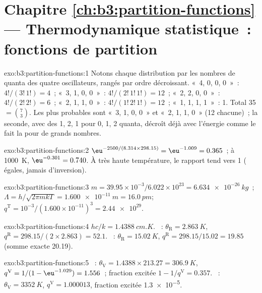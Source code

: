 \section*{Chapitre \ref{ch:b3:partition-functions} --- Thermodynamique statistique~: fonctions de partition}

\begin{solution}{exo:b3:partition-functions:1}
Notons chaque distribution par les nombres de quanta des quatre
oscillateurs, rangés par ordre décroissant. «~4, 0, 0, 0~»~: $4!/(3!\,1!) = 4$~; «~3, 1, 0, 0~»~: $4!/(2!\,1!\,1!) = 12$~; «~2, 2, 0, 0~»~:
$4!/(2!\,2!) = 6$~; «~2, 1, 1, 0~»~: $4!/(1!\,2!\,1!) = 12$~; «~1, 1, 1, 1~»~: 1. Total 35 $= \binom73$.
Les plus probables sont «~3, 1, 0, 0~» et «~2, 1, 1, 0~» (12 chacune)~;
la seconde, avec des  1, 2, 1 pour 0, 1, 2 quanta, décroît
déjà avec l'énergie comme le fait la  pour de
grands nombres.
\end{solution}

\begin{solution}{exo:b3:partition-functions:2}
$\eu^{-2500/(8.314 \times 298.15)} = \eu^{-1.009} = 0.365$~; à \qty{1000}{K}, $\eu^{-0.301} = 0.740$.
À très haute température, le rapport tend vers 1 ( égales,
jamais d'inversion).
\end{solution}

\begin{solution}{exo:b3:partition-functions:3}
$m = 39.95\times10^{-3}/6.022\times10^{23} = \qty{6.634e-26}{kg}$~; $\Lambda = h/\sqrt{2\pi mkT} =
\qty{1.600e-11}{m} = \qty{16.0}{pm}$; $q^{\mathrm T} = 10^{-3}/(1.600\times10^{-11})^3 = \num{2.44e29}$.
\end{solution}

\begin{solution}{exo:b3:partition-functions:4}
$hc/k = \qty{1.4388}{cm.K}$. ~: $\theta_{\mathrm R} = \qty{2.863}{K}$, $q^{\mathrm R} = 298.15/(2 \times 2.863) = 52.1$.
~: $\theta_{\mathrm R} = \qty{15.02}{K}$, $q^{\mathrm R} = 298.15/15.02 = 19.85$
(somme exacte 20.19).
\end{solution}

\begin{solution}{exo:b3:partition-functions:5}
~: $\theta_{\mathrm V} = 1.4388 \times 213.27 = \qty{306.9}{K}$, $q^{\mathrm V} = 1/(1 - \eu^{-1.029}) = 1.556$~;
fraction excitée $1 - 1/q^{\mathrm V} = 0.357$. ~: $\theta_{\mathrm V} = \qty{3352}{K}$, $q^{\mathrm V} = 1.000013$,
fraction excitée \num{1.3e-5}.
\end{solution}

